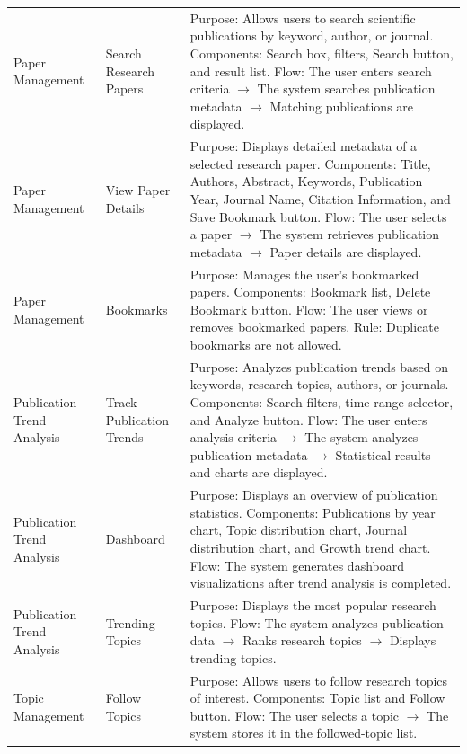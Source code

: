 \documentclass[12pt,a4paper]{article}
\begin{document}
{\begin{longtable}{|>{\raggedright\arraybackslash}p{}|>{\raggedright\arraybackslash}p{}|>{\raggedright\arraybackslash}p{}|}
		Paper Management &
		Search Research Papers &
		Purpose: Allows users to search scientific publications by keyword, author, or journal. Components: Search box, filters, Search button, and result list. Flow: The user enters search criteria $\rightarrow$ The system searches publication metadata $\rightarrow$ Matching publications are displayed. \\
		
		Paper Management &
		View Paper Details &
		Purpose: Displays detailed metadata of a selected research paper. Components: Title, Authors, Abstract, Keywords, Publication Year, Journal Name, Citation Information, and Save Bookmark button. Flow: The user selects a paper $\rightarrow$ The system retrieves publication metadata $\rightarrow$ Paper details are displayed. \\
		
		Paper Management &
		Bookmarks &
		Purpose: Manages the user's bookmarked papers. Components: Bookmark list, Delete Bookmark button. Flow: The user views or removes bookmarked papers. Rule: Duplicate bookmarks are not allowed. \\
		
		Publication Trend Analysis &
		Track Publication Trends &
		Purpose: Analyzes publication trends based on keywords, research topics, authors, or journals. Components: Search filters, time range selector, and Analyze button. Flow: The user enters analysis criteria $\rightarrow$ The system analyzes publication metadata $\rightarrow$ Statistical results and charts are displayed. \\
		
		Publication Trend Analysis &
		Dashboard &
		Purpose: Displays an overview of publication statistics. Components: Publications by year chart, Topic distribution chart, Journal distribution chart, and Growth trend chart. Flow: The system generates dashboard visualizations after trend analysis is completed. \\
		
		Publication Trend Analysis &
		Trending Topics &
		Purpose: Displays the most popular research topics. Flow: The system analyzes publication data $\rightarrow$ Ranks research topics $\rightarrow$ Displays trending topics. \\
		
		Topic Management &
		Follow Topics &
		Purpose: Allows users to follow research topics of interest. Components: Topic list and Follow button. Flow: The user selects a topic $\rightarrow$ The system stores it in the followed-topic list. \\
		

\end{longtable}}
\end{document}
